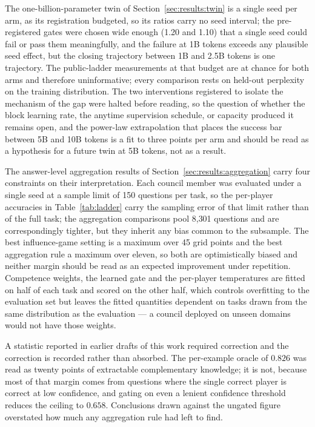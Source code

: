 The one-billion-parameter twin of Section~\ref{sec:results:twin} is a single seed per arm, as its registration budgeted, so its ratios carry no seed interval; the pre-registered gates were chosen wide enough (1.20 and 1.10) that a single seed could fail or pass them meaningfully, and the failure at 1B tokens exceeds any plausible seed effect, but the closing trajectory between 1B and 2.5B tokens is one trajectory. The public-ladder measurements at that budget are at chance for both arms and therefore uninformative; every comparison rests on held-out perplexity on the training distribution. The two interventions registered to isolate the mechanism of the gap were halted before reading, so the question of whether the block learning rate, the anytime supervision schedule, or capacity produced it remains open, and the power-law extrapolation that places the success bar between 5B and 10B tokens is a fit to three points per arm and should be read as a hypothesis for a future twin at 5B tokens, not as a result.

The answer-level aggregation results of Section~\ref{sec:results:aggregation}
carry four constraints on their interpretation. Each council member was evaluated
under a single seed at a sample limit of 150 questions per task, so the
per-player accuracies in Table~\ref{tab:ladder} carry the sampling error of that
limit rather than of the full task; the aggregation comparisons pool 8{,}301
questions and are correspondingly tighter, but they inherit any bias common to
the subsample. The best influence-game setting is a maximum over 45 grid points
and the best aggregation rule a maximum over eleven, so both are optimistically
biased and neither margin should be read as an expected improvement under
repetition. Competence weights, the learned gate and the per-player temperatures
are fitted on half of each task and scored on the other half, which controls
overfitting to the evaluation set but leaves the fitted quantities dependent on
tasks drawn from the same distribution as the evaluation --- a council deployed
on unseen domains would not have those weights.

A statistic reported in earlier drafts of this work required correction and the
correction is recorded rather than absorbed. The per-example oracle of $0.826$
was read as twenty points of extractable complementary knowledge; it is not,
because most of that margin comes from questions where the single correct player
is correct at low confidence, and gating on even a lenient confidence threshold
reduces the ceiling to $0.658$. Conclusions drawn against the ungated figure
overstated how much any aggregation rule had left to find.

